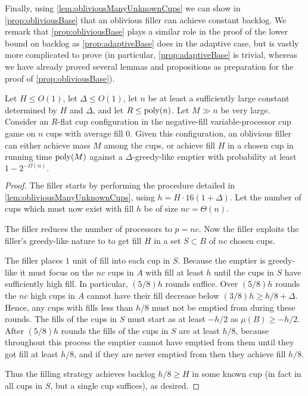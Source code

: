 Finally, using \cref{lem:obliviousManyUnknownCups} we can show in
\cref{prop:obliviousBase} that an oblivious filler can achieve
constant backlog. We remark that \cref{prop:obliviousBase} plays a
similar role in the proof of the lower bound on backlog as
\cref{prop:adaptiveBase} does in the adaptive case, but is vastly
more complicated to prove (in particular,
\cref{prop:adaptiveBase} is trivial, whereas we have already
proved several lemmas and propositions as preparation for the
proof of \cref{prop:obliviousBase}).
\begin{proposition}
  \label{prop:obliviousBase}
  Let $H \le O(1)$, let $\Delta \le O(1)$, let $n$ be at
  least a sufficiently large constant determined by $H$ and
  $\Delta$, and let $R \le \operatorname{\text{poly}}(n)$. 
  Let $M \gg n$ be very large.
  Consider an $R$-flat cup configuration in the negative-fill variable-processor cup
  game on $n$ cups with average fill $0$.
  Given this configuration, an oblivious filler can either
  achieve mass $M$ among the cups, or achieve fill $H$
  in a chosen cup in running time $\operatorname{\text{poly}}(M)$ against a
  $\Delta$-greedy-like emptier with probability at least $1-2^{-\Omega(n)}.$
\end{proposition}
\begin{proof}
  The filler starts by performing the procedure detailed in
  \cref{lem:obliviousManyUnknownCups}, using $h = H\cdot
  16(1+\Delta)$. Let the number of cups which must now exist with
  fill $h$ be of size $nc = \Theta(n)$.

  The filler reduces the number of processors to $p=nc$. 
  Now the filler exploits the filler's greedy-like nature to
  to get fill $H$ in a set $S\subset B$ of $nc$ chosen cups.

  The filler places $1$ unit of fill into each cup in $S$.
  Because the emptier is greedy-like it must focus on the $nc$
  cups in $A$ with fill at least $h$ until the cups in $S$ have
  sufficiently high fill. In particular, $(5/8)h$ rounds suffice.
  Over $(5/8)h$ rounds the $nc$ high cups in $A$ cannot have
  their fill decrease below $(3/8)h \ge h/8 + \Delta$. Hence, any
  cups with fills less than $h/8$ must not be emptied from during
  these rounds. The fills of the cups in $S$ must start as at
  least $-h/2$ as $\mu(B) \ge -h/2$. After $(5/8)h$ rounds the
  fills of the cups in $S$ are at least $h/8$, because throughout
  this process the emptier cannot have emptied from them until
  they got fill at least $h/8$, and if they are never emptied
  from then they achieve fill $h/8$.

  Thus the filling strategy achieves backlog $h/8 \ge H$ in some
  known cup (in fact in all cups in $S$, but a single cup
  suffices), as desired.

\end{proof}

